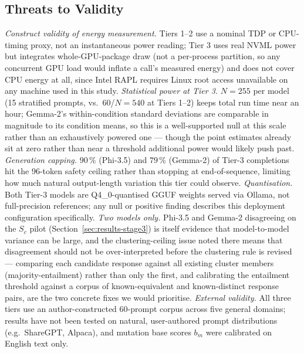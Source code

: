 \documentclass[conference]{IEEEtran}
\begin{document}
\subsection{Threats to Validity}
\label{sec:limits}
\emph{Construct validity of energy measurement.} Tiers 1--2 use a
nominal TDP or CPU-timing proxy, not an instantaneous power reading;
Tier 3 uses real NVML power but integrates whole-GPU-package draw (not
a per-process partition, so any concurrent GPU load would inflate a
call's measured energy) and does not cover CPU energy at all, since
Intel RAPL requires Linux root access unavailable on any machine used
in this study. \emph{Statistical power at Tier 3.} $N=255$ per model
(15 stratified prompts, vs.\ 60/$N=540$ at Tiers 1--2) keeps total run
time near an hour; Gemma-2's within-condition standard deviations are
comparable in magnitude to its condition means, so this is a
well-supported null at this scale rather than an exhaustively powered
one --- though the point estimates already sit at zero rather than
near a threshold additional power would likely push past.
\emph{Generation capping.} $90\,\%$ (Phi-3.5) and $79\,\%$ (Gemma-2)
of Tier-3 completions hit the 96-token safety ceiling rather than
stopping at end-of-sequence, limiting how much natural output-length
variation this tier could observe. \emph{Quantisation.} Both Tier-3
models are Q4\_0-quantised GGUF weights served via Ollama, not
full-precision references; any null or positive finding describes this
deployment configuration specifically. \emph{Two models only.}
Phi-3.5 and Gemma-2 disagreeing on the $S_c$ pilot
(Section~\ref{sec:results-stage3}) is itself evidence that
model-to-model variance can be large, and the clustering-ceiling issue
noted there means that disagreement should not be over-interpreted
before the clustering rule is revised --- comparing each candidate
response against all existing cluster members (majority-entailment)
rather than only the first, and calibrating the entailment threshold
against a corpus of known-equivalent and known-distinct response
pairs, are the two concrete fixes we would prioritise. \emph{External
validity.} All three tiers use an author-constructed 60-prompt corpus
across five general domains; results have not been tested on natural,
user-authored prompt distributions (e.g.\ ShareGPT, Alpaca), and
mutation base scores $b_m$ were calibrated on English text only.
\end{document}
